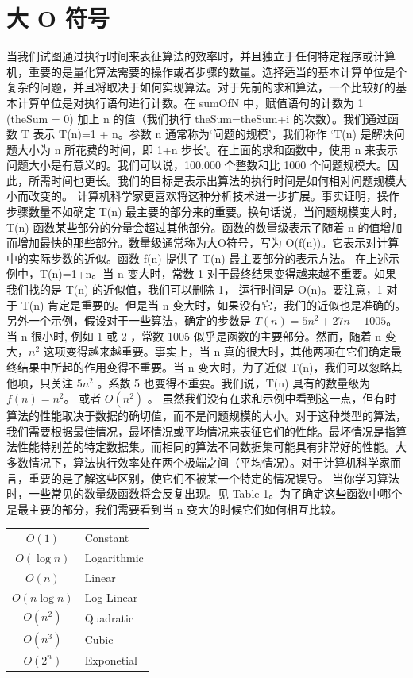 \section{大 O 符号}
当我们试图通过执行时间来表征算法的效率时，并且独立于任何特定程序或计算机，重要的是量化算法需要的操作或者步骤的数量。选择适当的基本计算单位是个复杂的问题，并且将取决于如何实现算法。对于先前的求和算法，一个比较好的基本计算单位是对执行语句进行计数。在 sumOfN 中，赋值语句的计数为 1 (theSum = 0) 加上 n 的值（我们执行 theSum=theSum+i 的次数）。我们通过函数 T 表示 T(n)=1 + n。参数 n 通常称为‘问题的规模’，我们称作 ‘T(n) 是解决问题大小为 n 所花费的时间，即 1+n 步长’。在上面的求和函数中，使用 n 来表示问题大小是有意义的。我们可以说，100,000 个整数和比 1000 个问题规模大。因此，所需时间也更长。我们的目标是表示出算法的执行时间是如何相对问题规模大小而改变的。
计算机科学家更喜欢将这种分析技术进一步扩展。事实证明，操作步骤数量不如确定 T(n) 最主要的部分来的重要。换句话说，当问题规模变大时，T(n) 函数某些部分的分量会超过其他部分。函数的数量级表示了随着 n 的值增加而增加最快的那些部分。数量级通常称为大O符号，写为 O(f(n))。它表示对计算中的实际步数的近似。函数 f(n) 提供了 T(n) 最主要部分的表示方法。
在上述示例中，T(n)=1+n。当 n 变大时，常数 1 对于最终结果变得越来越不重要。如果我们找的是 T(n) 的近似值，我们可以删除 1， 运行时间是 O(n)。要注意，1 对于 T(n) 肯定是重要的。但是当 n 变大时，如果没有它，我们的近似也是准确的。
另外一个示例，假设对于一些算法，确定的步数是 $T(n)=5n^2 +27n+1005$。当 n 很小时, 例如 1 或 2 ，常数 1005 似乎是函数的主要部分。然而，随着 n 变大，$n^2$ 这项变得越来越重要。事实上，当 n 真的很大时，其他两项在它们确定最终结果中所起的作用变得不重要。当 n 变大时，为了近似 T(n)，我们可以忽略其他项，只关注 $5n^2$ 。系数 5 也变得不重要。我们说，T(n) 具有的数量级为 $f(n)=n^2$。 或者 $O( n^2 )$ 。
虽然我们没有在求和示例中看到这一点，但有时算法的性能取决于数据的确切值，而不是问题规模的大小。对于这种类型的算法，我们需要根据最佳情况，最坏情况或平均情况来表征它们的性能。最坏情况是指算法性能特别差的特定数据集。而相同的算法不同数据集可能具有非常好的性能。大多数情况下，算法执行效率处在两个极端之间（平均情况）。对于计算机科学家而言，重要的是了解这些区别，使它们不被某一个特定的情况误导。
当你学习算法时，一些常见的数量级函数将会反复出现。见 Table 1。为了确定这些函数中哪个是最主要的部分，我们需要看到当 n 变大的时候它们如何相互比较。

\begin{table}[htbp]
\centering
\begin{tabular}{|c|l|}\hline
$O(1)$ & Constant \\
$O(\log n)$ & Logarithmic\\
$O(n)$ & Linear\\
$O(n \log n)$ & Log Linear\\
$O(n^2)$ & Quadratic\\
$O(n^3)$ & Cubic\\
$O(2^n)$ & Exponetial\\\hline
\end{tabular}
\end{table}

